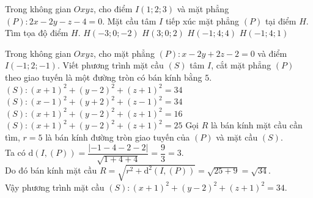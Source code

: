 \begin{ex}%
	Trong không gian $Oxyz$, cho điểm $I(1;2;3)$ và mặt phẳng $(P):2x-2y-z-4=0.$ Mặt cầu tâm $I$ tiếp xúc mặt phẳng $(P)$  tại điểm $H$.
	Tìm tọa độ điểm $H$.
	\choice
	{$H(-3;0;-2)$}
	{\True $H(3;0;2)$}
	{$H(-1;4;4)$}
	{$H(-1;4;1)$}
\end{ex}
\begin{ex}%
	Trong không gian $Oxyz$, cho mặt phẳng $(P)\colon x-2y+2z-2=0$ và điểm $I(-1;2;-1)$. Viết phương trình mặt cầu $(S)$ tâm $I$, cắt mặt phẳng $(P)$ theo giao tuyến là một đường tròn có bán kính bằng $5$.
	\choice
	{\True $(S)\colon (x+1)^2+(y-2)^2+(z+1)^2=34$}
	{$(S)\colon (x-1)^2+(y+2)^2+(z-1)^2=34$}
	{$(S)\colon (x+1)^2+(y-2)^2+(z+1)^2=16$}
	{$(S)\colon (x+1)^2+(y-2)^2+(z+1)^2=25$}
	\loigiai
	{Gọi $R$ là bán kính mặt cầu cần tìm, $r=5$ là bán kính đường tròn giao tuyến của $(P)$ và mặt cầu $(S)$.\\
		Ta có $\mathrm{d}(I,(P))=\dfrac{|-1-4-2-2|}{\sqrt{1+4+4}}=\dfrac{9}{3}=3$.\\
		Do đó bán kính mặt cầu $R=\sqrt{r^2+\mathrm{d}^2(I,(P))}=\sqrt{25+9}=\sqrt{34}$.\\
		Vậy phương trình mặt cầu $(S)\colon (x+1)^2+(y-2)^2+(z+1)^2=34$.}
\end{ex}
